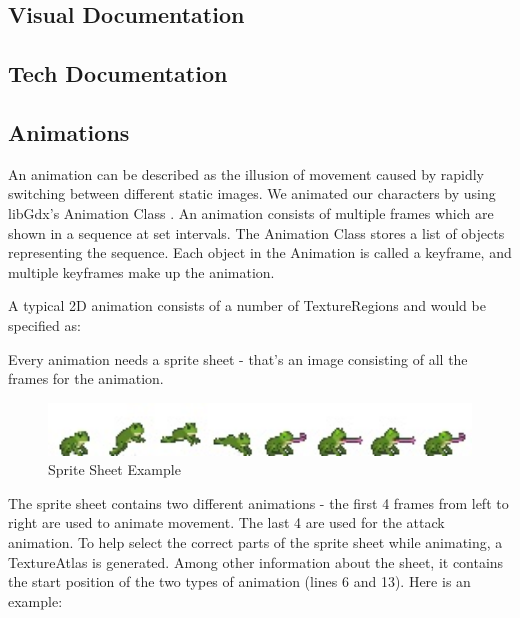 \documentclass[12p]{article}
\begin{document}

\subsection{Visual Documentation} \label{DocVisual}


\subsection{Tech Documentation} \label{DocTech}


\subsection{Animations} \label{DocAnimations}

An animation can be described as the illusion of movement caused by rapidly switching between different static images. We animated our characters by using libGdx's Animation Class \cite{libGdxAnimClass}. An animation consists of multiple frames which are shown in a sequence at set intervals. The Animation Class stores a list of objects representing the sequence. Each object in the Animation is called a keyframe, and multiple keyframes make up the animation.

A typical 2D animation consists of a number of TextureRegions and would be specified as:


Every animation needs a sprite sheet - that's an image consisting of all the frames for the animation.

\begin{figure}[ht]
  \center
  \includegraphics[width=1\textwidth]{Documentation/frog.jpg}
  \caption{Sprite Sheet Example}
  \label{SpriteSheetExample}
\end{figure}

The sprite sheet contains two different animations - the first 4 frames from left to right are used to animate movement. The last 4 are used for the attack animation. To help select the correct parts of the sprite sheet while animating, a TextureAtlas is generated. Among other information about the sheet, it contains the start position of the two types of animation (lines 6 and 13). Here is an example:
\end{document}
